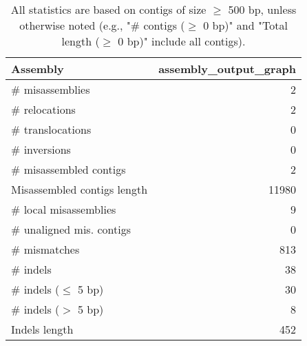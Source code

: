\documentclass[12pt,a4paper]{article}
\begin{document}
\begin{table}[ht]
\begin{center}
\caption{All statistics are based on contigs of size $\geq$ 500 bp, unless otherwise noted (e.g., "\# contigs ($\geq$ 0 bp)" and "Total length ($\geq$ 0 bp)" include all contigs).}
\begin{tabular}{|l*{1}{|r}|}
\hline
Assembly & assembly\_output\_graph \\ \hline
\# misassemblies & 2 \\ \hline
\hspace{5mm}\# relocations & 2 \\ \hline
\hspace{5mm}\# translocations & 0 \\ \hline
\hspace{5mm}\# inversions & 0 \\ \hline
\# misassembled contigs & 2 \\ \hline
Misassembled contigs length & 11980 \\ \hline
\# local misassemblies & 9 \\ \hline
\# unaligned mis. contigs & 0 \\ \hline
\# mismatches & 813 \\ \hline
\# indels & 38 \\ \hline
\hspace{5mm}\# indels ($\leq$ 5 bp) & 30 \\ \hline
\hspace{5mm}\# indels ($>$ 5 bp) & 8 \\ \hline
Indels length & 452 \\ \hline
\end{tabular}
\end{center}
\end{table}
\end{document}
